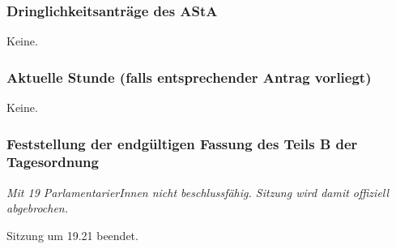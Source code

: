 \documentclass[ngerman,headheight=70pt]{scrartcl}
\begin{document}
    \subsubsection{Dringlichkeitsanträge des AStA}

    Keine.

    \subsubsection{Aktuelle Stunde (falls entsprechender Antrag vorliegt)}

    Keine.

    \subsubsection{Feststellung der endgültigen Fassung des Teils B der Tagesordnung}

    \textit{Mit 19 ParlamentarierInnen nicht beschlussfähig. Sitzung wird damit
    offiziell abgebrochen.}

    Sitzung um 19.21 beendet.
\end{document}
